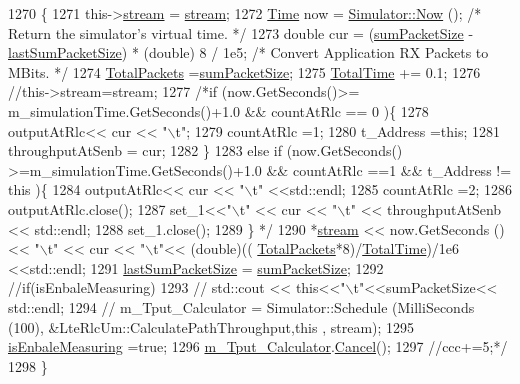 \begin{DoxyCode}
1270 \{
1271         this->\hyperlink{classns3_1_1LteRlcUm_a8509783beb5d5625757bdf93549079f6}{stream} = \hyperlink{classns3_1_1LteRlcUm_a8509783beb5d5625757bdf93549079f6}{stream};
1272 \hyperlink{namespacens3_1_1TracedValueCallback_a7ffd3e7c142ffe7c8a1d2db9b8de38ec}{Time} now = \hyperlink{classns3_1_1Simulator_ac3178fa975b419f7875e7105be122800}{Simulator::Now} ();                                         \textcolor{comment}{/* Return the
       simulator's virtual time. */}
1273   \textcolor{keywordtype}{double} cur = (\hyperlink{classns3_1_1LteRlcUm_aa873d03add0bb0b7d5a9ac3224685fd2}{sumPacketSize} - \hyperlink{classns3_1_1LteRlcUm_a015feff20aa27cbdb84c18fbdb482027}{lastSumPacketSize}) * (\textcolor{keywordtype}{double}) 8 / 1e5;     \textcolor{comment}{/*
       Convert Application RX Packets to MBits. */}
1274 \hyperlink{classns3_1_1LteRlcUm_aa73359807fbf8026a89c765b619e0e30}{TotalPackets} =\hyperlink{classns3_1_1LteRlcUm_aa873d03add0bb0b7d5a9ac3224685fd2}{sumPacketSize};
1275 \hyperlink{classns3_1_1LteRlcUm_a94d9298d5b49e9f301caacf6c849eacc}{TotalTime} += 0.1;
1276 \textcolor{comment}{//this->stream=stream;}
1277 \textcolor{comment}{/*if (now.GetSeconds()>= m\_simulationTime.GetSeconds()+1.0 && countAtRlc == 0 )\{}
1278 \textcolor{comment}{        outputAtRlc<< cur << "\(\backslash\)t";}
1279 \textcolor{comment}{        countAtRlc =1;}
1280 \textcolor{comment}{        t\_Address =this;}
1281 \textcolor{comment}{        throughputAtSenb = cur;}
1282 \textcolor{comment}{\}}
1283 \textcolor{comment}{else if (now.GetSeconds() >=m\_simulationTime.GetSeconds()+1.0 && countAtRlc ==1 && t\_Address != this )\{}
1284 \textcolor{comment}{        outputAtRlc<< cur << "\(\backslash\)t" <<std::endl;}
1285 \textcolor{comment}{        countAtRlc =2;}
1286 \textcolor{comment}{        outputAtRlc.close();}
1287 \textcolor{comment}{        set\_1<<"\(\backslash\)t" << cur << "\(\backslash\)t" << throughputAtSenb << std::endl;}
1288 \textcolor{comment}{    set\_1.close();}
1289 \textcolor{comment}{\} */}
1290   *\hyperlink{classns3_1_1LteRlcUm_a8509783beb5d5625757bdf93549079f6}{stream} << now.GetSeconds () << \textcolor{stringliteral}{"\(\backslash\)t"} << cur << \textcolor{stringliteral}{"\(\backslash\)t"}<< (double)((
      \hyperlink{classns3_1_1LteRlcUm_aa73359807fbf8026a89c765b619e0e30}{TotalPackets}*8)/\hyperlink{classns3_1_1LteRlcUm_a94d9298d5b49e9f301caacf6c849eacc}{TotalTime})/1e6 <<std::endl;
1291   \hyperlink{classns3_1_1LteRlcUm_a015feff20aa27cbdb84c18fbdb482027}{lastSumPacketSize} = \hyperlink{classns3_1_1LteRlcUm_aa873d03add0bb0b7d5a9ac3224685fd2}{sumPacketSize};
1292   \textcolor{comment}{//if(isEnbaleMeasuring)}
1293  \textcolor{comment}{// std::cout << this<<"\(\backslash\)t"<<sumPacketSize<< std::endl;}
1294 \textcolor{comment}{// m\_Tput\_Calculator = Simulator::Schedule (MilliSeconds (100), &LteRlcUm::CalculatePathThroughput,this ,
       stream);}
1295   \hyperlink{classns3_1_1LteRlcUm_a33e4345196c0c97f6b1954e108ccbb45}{isEnbaleMeasuring} =\textcolor{keyword}{true};
1296   \hyperlink{classns3_1_1LteRlcUm_af24ae932eded5469f4ad2185b656bee1}{m\_Tput\_Calculator}.\hyperlink{classns3_1_1EventId_a993ae94e48e014e1afd47edb16db7a11}{Cancel}();
1297   \textcolor{comment}{//ccc+=5;*/}
1298 \}
\end{DoxyCode}


